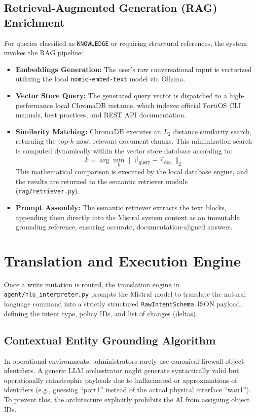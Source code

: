 \subsection{Retrieval-Augmented Generation (RAG) Enrichment}
For queries classified as \texttt{KNOWLEDGE} or requiring structural references, the system invokes the RAG pipeline:
\begin{itemize}
    \item \textbf{Embeddings Generation:} The user's raw conversational input is vectorized utilizing the local \texttt{nomic-embed-text} model via Ollama.
    \item \textbf{Vector Store Query:} The generated query vector is dispatched to a high-performance local ChromaDB instance, which indexes official FortiOS CLI manuals, best practices, and REST API documentation.
    \item \textbf{Similarity Matching:} ChromaDB executes an $L_2$ distance similarity search, returning the top-$k$ most relevant document chunks. This minimization search is computed dynamically within the vector store database according to:
    \begin{equation}
        k = \arg\min_{k} \| \vec{v}_{\text{query}} - \vec{v}_{\text{doc}_i} \|_2
    \end{equation}
    This mathematical comparison is executed by the local database engine, and the results are returned to the semantic retriever module (\texttt{rag/retriever.py}).
    \item \textbf{Prompt Assembly:} The semantic retriever extracts the text blocks, appending them directly into the Mistral system context as an immutable grounding reference, ensuring accurate, documentation-aligned answers.
\end{itemize}

\section{Translation and Execution Engine}
Once a write mutation is routed, the translation engine in \texttt{agent/nlu\_interpreter.py} prompts the Mistral model to translate the natural language command into a strictly structured \texttt{RawIntentSchema} JSON payload, defining the intent type, policy IDs, and list of changes (deltas).

\subsection{Contextual Entity Grounding Algorithm}
In operational environments, administrators rarely use canonical firewall object identifiers. A generic LLM orchestrator might generate syntactically valid but operationally catastrophic payloads due to hallucinated or approximations of identifiers (e.g., guessing ``port1'' instead of the actual physical interface ``wan1''). To prevent this, the architecture explicitly prohibits the AI from assigning object IDs.


